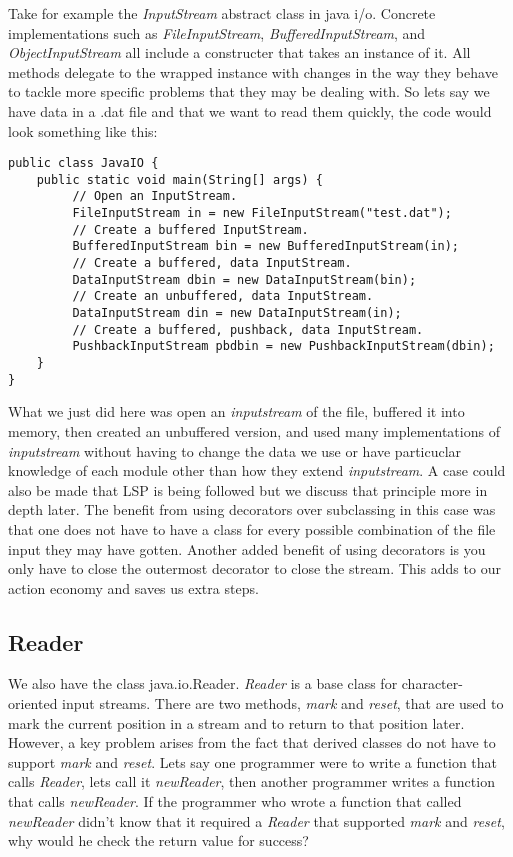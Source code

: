 \documentclass[12pt]{article}
\begin{document}
Take for example the \emph{InputStream} abstract class in java i/o. Concrete implementations such as \emph{FileInputStream}, \emph{BufferedInputStream}, and \emph{ObjectInputStream} all include a constructer that takes an instance of it. All methods delegate to the wrapped instance with changes in the way they behave to tackle more specific problems that they may be dealing with. So lets say we have data in a .dat file and that we want to read them quickly, the code would look something like this:

\begin{lstlisting}[label=some-code,caption=Some Code]
public class JavaIO {
    public static void main(String[] args) {
         // Open an InputStream.
         FileInputStream in = new FileInputStream("test.dat");
         // Create a buffered InputStream.
         BufferedInputStream bin = new BufferedInputStream(in);
         // Create a buffered, data InputStream.
         DataInputStream dbin = new DataInputStream(bin);
         // Create an unbuffered, data InputStream.
         DataInputStream din = new DataInputStream(in);
         // Create a buffered, pushback, data InputStream.
         PushbackInputStream pbdbin = new PushbackInputStream(dbin);
    }
}
\end{lstlisting}

What we just did here was open an \emph{inputstream} of the file, buffered it into memory, then created an unbuffered version, and used many implementations of \emph{inputstream} without having to change the data we use or have particuclar knowledge of each module other than how they extend \emph{inputstream}. A case could also be made that LSP is being followed but we discuss that principle more in depth later. The benefit from using decorators over subclassing in this case was that one does not have to have a class for every possible combination of the file input they may have gotten. Another added benefit of using decorators is you only have to close the outermost decorator to close the stream. This adds to our action economy and saves us extra steps.

\subsection{Reader}
We also have the class java.io.Reader. \emph{Reader} is a base class for character-oriented input streams. There are two methods, \emph{mark} and \emph{reset}, that are used to mark the current position in a stream and to return to that position later. However, a key problem arises from the fact that derived classes do not have to support \emph{mark} and \emph{reset}. Lets say one programmer were to write a function that calls \emph{Reader}, lets call it \emph{newReader}, then another programmer writes a function that calls \emph{newReader}. If the programmer who wrote a function that called \emph{newReader} didn’t know that it required a \emph{Reader} that supported \emph{mark} and \emph{reset}, why would he check the return value for success? 
\end{document}
